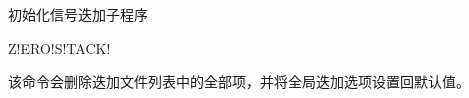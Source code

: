 \label{sss:zerostack}

初始化信号迭加子程序

\begin{SACSTX}
Z!ERO!S!TACK!
\end{SACSTX}

该命令会删除迭加文件列表中的全部项，并将全局迭加选项设置回默认值。

